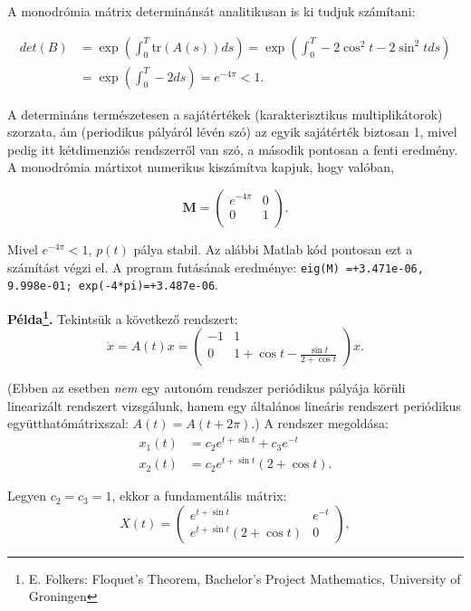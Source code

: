 A monodrómia mátrix determinánsát analitikusan is ki tudjuk számítani:

\begin{align}
det(B)&=\exp \left( \int_0^T \mathrm{tr}(A(s)) ds\right)=\exp \left( \int_0^T -2\cos^2t-2\sin^2t ds\right)\\
&=\exp \left( \int_0^T -2 ds\right)=e^{-4\pi}<1.
\end{align}

A determináns természetesen a sajátértékek (karakterisztikus multiplikátorok) szorzata, ám (periodikus pályáról lévén szó) az egyik sajátérték biztosan 1, mivel pedig itt kétdimenziós rendszerről van szó, a második pontosan a fenti eredmény. A monodrómia mártixot numerikus kiszámítva kapjuk, hogy valóban,

\begin{equation}
\mathbf{M}=\begin{pmatrix}
e^{-4\pi} & 0\\ 0 & 1\\
\end{pmatrix}.
\end{equation}

Mivel $e^{-4\pi}<1$, $p(t)$ pálya stabil. Az alábbi Matlab kód pontosan ezt a számítást végzi el. A program futásának eredménye: {\tt eig(M)    =+3.471e-06, 9.998e-01; exp(-4*pi)=+3.487e-06}.



\textbf{Példa\footnote{E. Folkers: Floquet’s Theorem, Bachelor’s Project Mathematics, University of Groningen}.} Tekintsük a következő rendszert:
%
\begin{equation}
\dot{x}=A(t)x=\begin{pmatrix}
-1 & 1\\
0 & 1+ \cos t-\frac{\sin t}{2+\cos t}
\end{pmatrix}x.
\end{equation}

(Ebben az esetben \emph{nem} egy autonóm rendszer periódikus pályája körüli linearizált rendszert vizsgálunk, hanem egy általános lineáris rendszert periódikus együtthatómátrixszal: $A(t)=A(t+2\pi)$.) A rendszer megoldása:
%
\begin{align}
x_1(t)&=c_2 e^{t+\sin t}+c_3 e^{-t}\\
x_2(t)&=c_2e^{t+\sin t}\left( 2+\cos t\right).
\end{align}

Legyen $c_2=c_3=1$, ekkor a fundamentális mátrix:
%
\begin{equation}
X(t)=
\begin{pmatrix}
e^{t+\sin t} &  e^{-t}\\
e^{t+\sin t}\left( 2+\cos t\right) &0
\end{pmatrix},
\end{equation}

